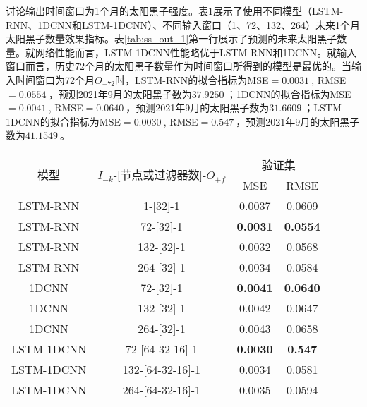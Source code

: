 讨论输出时间窗口为1个月的太阳黑子强度。表\ref{tab:ss_number_out_1}展示了使用不同模型（LSTM-RNN、1DCNN和LSTM-1DCNN）、不同输入窗口（1、72、132、264）未来1个月太阳黑子数量效果指标。表\ref{tab:ss_out_1}第一行展示了预测的未来太阳黑子数量。就网络性能而言，LSTM-1DCNN性能略优于LSTM-RNN和1DCNN。就输入窗口而言，历史72个月的太阳黑子数量作为时间窗口所得到的模型是最优的。当输入时间窗口为72个月$O_{-72}$时，LSTM-RNN的拟合指标为MSE$=\SI{0.0031}{}$, RMSE$=\SI{0.0554}{}$，预测2021年9月的太阳黑子数为$\SI{37.9250}{}$；1DCNN的拟合指标为MSE$=\SI{0.0041}{}$, RMSE$=\SI{0.0640}{}$，预测2021年9月的太阳黑子数为$\SI{31.6609}{}$；LSTM-1DCNN的拟合指标为MSE$=\SI{0.0030}{}$, RMSE$=\SI{0.547}{}$，预测2021年9月的太阳黑子数为$\SI{41.1549}{}$。

\begin{table}[!htbp]
  \centering
  \label{tab:ss_number_out_1}
  \footnotesize
  \renewcommand{\arraystretch}{1}
  \begin{tabular}{ccccc}
    \toprule
    \multirow{2}{*}{模型} & \multirow{2}{*}{$I_{-k}$-[节点或过滤器数]-$O_{+f}$} & \multicolumn{2}{c}{验证集}\\
    \cmidrule(lr){3-4}
    \noalign{\smallskip}
    & & MSE & RMSE\\
    \midrule 
    LSTM-RNN & 1-[32]-1 & 0.0037 & 0.0609 \\
    LSTM-RNN & 72-[32]-1 & \textbf{0.0031} & \textbf{0.0554} \\
    LSTM-RNN & 132-[32]-1 & 0.0032 & 0.0568 \\
    LSTM-RNN & 264-[32]-1 & 0.0034 & 0.0584 \\
    \hline
    1DCNN & 72-[32]-1 & \textbf{0.0041} & \textbf{0.0640} \\
    1DCNN & 132-[32]-1 & 0.0042 & 0.0647 \\
    1DCNN & 264-[32]-1 & 0.0043 & 0.0658 \\
    \hline
    LSTM-1DCNN & 72-[64-32-16]-1 & \textbf{0.0030} & \textbf{0.547} \\
    LSTM-1DCNN & 132-[64-32-16]-1 & 0.0034 & 0.0581 \\
    LSTM-1DCNN & 264-[64-32-16]-1 & 0.0035 & 0.0594 \\
    \bottomrule
  \end{tabular}
\end{table}

